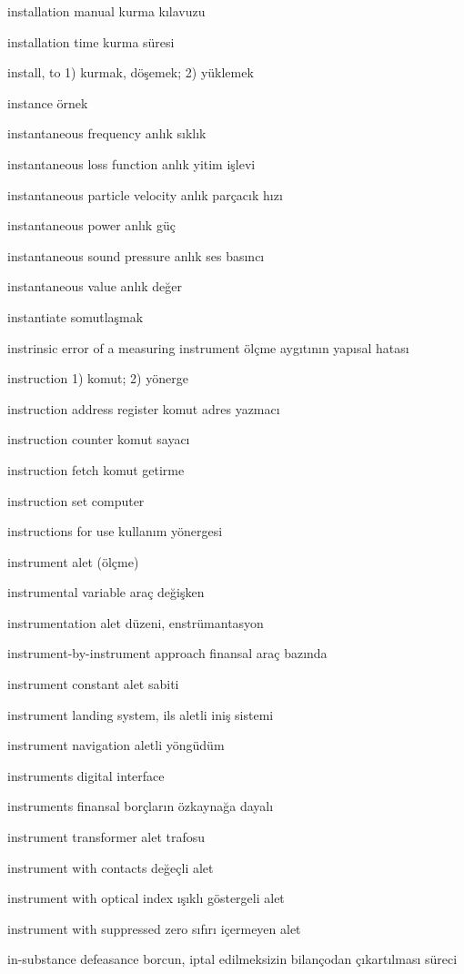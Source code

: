 \documentclass[12pt,fleqn]{article}\usepackage{../../common}
\begin{document}
installation manual kurma kılavuzu

installation time kurma süresi

install, to 1) kurmak, döşemek; 2) yüklemek

instance örnek

instantaneous frequency anlık sıklık

instantaneous loss function anlık yitim işlevi

instantaneous particle velocity anlık parçacık hızı

instantaneous power anlık güç

instantaneous sound pressure anlık ses basıncı

instantaneous value anlık değer

instantiate somutlaşmak

instrinsic error of a measuring instrument ölçme aygıtının yapısal hatası

instruction 1) komut; 2) yönerge

instruction address register komut adres yazmacı

instruction counter komut sayacı

instruction fetch komut getirme

instruction set computer

instructions for use kullanım yönergesi

instrument alet (ölçme)

instrumental variable araç değişken

instrumentation alet düzeni, enstrümantasyon

instrument-by-instrument approach finansal araç bazında

instrument constant alet sabiti

instrument landing system, ils aletli iniş sistemi

instrument navigation aletli yöngüdüm

instruments digital interface

instruments finansal borçların özkaynağa dayalı

instrument transformer alet trafosu

instrument with contacts değeçli alet

instrument with optical index ışıklı göstergeli alet

instrument with suppressed zero sıfırı içermeyen alet

in-substance defeasance borcun, iptal edilmeksizin bilançodan çıkartılması süreci
\end{document}

